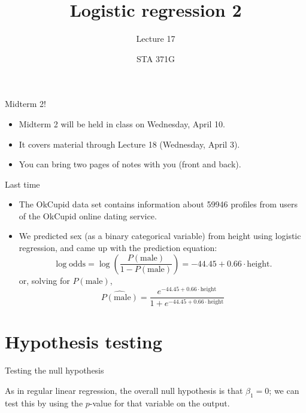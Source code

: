 \documentclass{beamer}\usepackage[]{graphicx}\usepackage[]{color}
\title{Logistic regression 2}
\subtitle{Lecture 17}
\author{STA 371G}
\begin{document}
  
  

  \frame{\maketitle}



  \begin{darkframes}
    \begin{frame}{Midterm 2!}
      \begin{itemize}
        \item Midterm 2 will be held in class on Wednesday, April 10.
        \item It covers material through Lecture 18 (Wednesday, April 3).
        \item You can bring \alert{two} pages of notes with you (front and back).
      \end{itemize}
    \end{frame}

    \begin{frame}{Last time}

      \begin{itemize}
        \item The OkCupid data set contains information about 59946 profiles from users of the OkCupid online dating service.
        \item We predicted sex (as a binary categorical variable) from height using logistic regression, and came up with the prediction equation:
        \[
          \log\text{odds} = \log\left(\frac{P(\text{male})}{1-P(\text{male})}\right) = -44.45 + 0.66\cdot\text{height}.
        \]
        or, solving for $P(\text{male})$,
        \[
          \widehat{P(\text{male})} = \frac{e^{-44.45 + 0.66\cdot\text{height}}}{1 + e^{-44.45 + 0.66\cdot\text{height}}}
        \]
      \end{itemize}
    \end{frame}

    \section{Hypothesis testing}

    \begin{frame}{Testing the null hypothesis}
      \begin{center}
        As in regular linear regression, the overall null hypothesis is that $\beta_1=0$; we can test this by using the $p$-value for that variable on the output.


\end{center}
\end{frame}
\end{darkframes}
\end{document}

